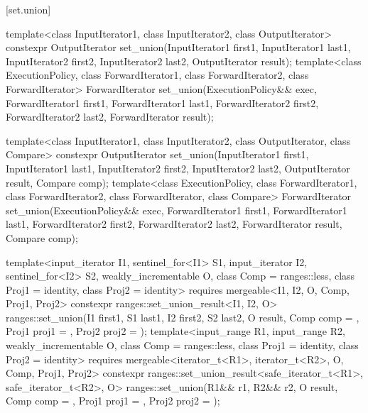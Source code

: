 [set.union]{}

%
\begin{itemdecl}
template<class InputIterator1, class InputIterator2,
         class OutputIterator>
  constexpr OutputIterator
    set_union(InputIterator1 first1, InputIterator1 last1,
              InputIterator2 first2, InputIterator2 last2,
              OutputIterator result);
template<class ExecutionPolicy, class ForwardIterator1, class ForwardIterator2,
         class ForwardIterator>
  ForwardIterator
    set_union(ExecutionPolicy&& exec,
              ForwardIterator1 first1, ForwardIterator1 last1,
              ForwardIterator2 first2, ForwardIterator2 last2,
              ForwardIterator result);

template<class InputIterator1, class InputIterator2,
         class OutputIterator, class Compare>
  constexpr OutputIterator
    set_union(InputIterator1 first1, InputIterator1 last1,
              InputIterator2 first2, InputIterator2 last2,
              OutputIterator result, Compare comp);
template<class ExecutionPolicy, class ForwardIterator1, class ForwardIterator2,
         class ForwardIterator, class Compare>
  ForwardIterator
    set_union(ExecutionPolicy&& exec,
              ForwardIterator1 first1, ForwardIterator1 last1,
              ForwardIterator2 first2, ForwardIterator2 last2,
              ForwardIterator result, Compare comp);

template<input_iterator I1, sentinel_for<I1> S1, input_iterator I2, sentinel_for<I2> S2,
         weakly_incrementable O, class Comp = ranges::less,
         class Proj1 = identity, class Proj2 = identity>
  requires mergeable<I1, I2, O, Comp, Proj1, Proj2>
  constexpr ranges::set_union_result<I1, I2, O>
    ranges::set_union(I1 first1, S1 last1, I2 first2, S2 last2, O result, Comp comp = {},
                      Proj1 proj1 = {}, Proj2 proj2 = {});
template<input_range R1, input_range R2, weakly_incrementable O,
         class Comp = ranges::less, class Proj1 = identity, class Proj2 = identity>
  requires mergeable<iterator_t<R1>, iterator_t<R2>, O, Comp, Proj1, Proj2>
  constexpr ranges::set_union_result<safe_iterator_t<R1>, safe_iterator_t<R2>, O>
    ranges::set_union(R1&& r1, R2&& r2, O result, Comp comp = {},
                      Proj1 proj1 = {}, Proj2 proj2 = {});
\end{itemdecl}

